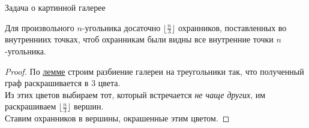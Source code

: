     \begin{frame}{Задача о картинной галерее}
        
        \vspace{2mm}
        \begin{thm}[Хватал]

            Для произвольного $n$-угольника досаточно $\lfloor \frac{n}{3} \rfloor$ охранников, поставленных во внутренниих точках, чтоб охранникам были видны
            все внутренние точки $n$-угольника.

        \end{thm}

        \begin{proof}

            По \hyperlink{trianglemm}{лемме} строим разбиение галереи на треугольники так, что полученный граф раскрашивается в 3 цвета. \\
            Из этих цветов выбираем тот, который встречается \emph{не чаще других}, им раскрашиваем $\lfloor \frac{n}{3} \rfloor$ вершин.\\
            Ставим охранников в вершины, окрашенные этим цветом.

        \end{proof}
    \end{frame}
